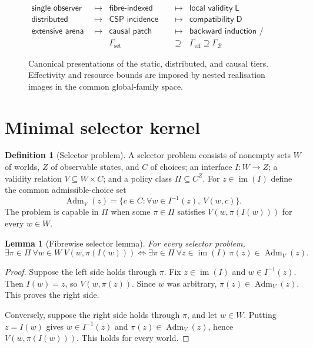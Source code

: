 \documentclass[11pt]{article}
\theoremstyle{plain}
\newtheorem{lemma}[theorem]{Lemma}
\theoremstyle{definition}
\newtheorem{definition}[theorem]{Definition}
\theoremstyle{remark}
\newcommand{\im}{\operatorname{im}}
\newcommand{\Adm}{\operatorname{Adm}}
\begin{document}
\begin{figure}[htbp]
\centering
\[
\begin{array}{rclcl}
\textsf{single observer}
&\longmapsto&
\textsf{fibre-indexed selector}
&\longmapsto&
\textsf{local validity}\;\mathsf L
\\[1mm]
\textsf{distributed observers}
&\longmapsto&
\textsf{CSP incidence diagram}
&\longmapsto&
\textsf{compatibility}\;\mathsf D
\\[1mm]
\textsf{extensive arena}
&\longmapsto&
\textsf{causal patch sheaf}
&\longmapsto&
\textsf{backward induction / matching}
\\[2mm]
&&
\Gamma_{\mathrm{set}}
&\supseteq&
\Gamma_{\mathrm{eff}}\supseteq\Gamma_{\mathcal B}
\end{array}
\]
\caption{Canonical presentations of the static, distributed, and causal tiers.
Effectivity and resource bounds are imposed by nested realisation images in the
common global-family space.}
\label{fig:architecture}
\end{figure}

\section{Minimal selector kernel}\label{sec:kernel}

\begin{definition}[Selector problem]\label{def:selector}
A selector problem consists of nonempty sets $W$ of worlds, $Z$ of observable
states, and $C$ of choices; an interface $I:W\to Z$; a validity relation
$V\subseteq W\times C$; and a policy class $\Pi\subseteq C^Z$. For
$z\in\im(I)$ define the common admissible-choice set
\[
\Adm_V(z)=\{c\in C:\forall w\in I^{-1}(z),\ V(w,c)\}.
\]
The problem is capable in $\Pi$ when some $\pi\in\Pi$ satisfies
$V(w,\pi(I(w)))$ for every $w\in W$.
\end{definition}

\begin{lemma}[Fibrewise selector lemma]\label{lem:selector}
For every selector problem,
\[
\exists\pi\in\Pi\ \forall w\in W\ V(w,\pi(I(w)))
\iff
\exists\pi\in\Pi\ \forall z\in\im(I)\ \pi(z)\in\Adm_V(z).
\]
\end{lemma}

\begin{proof}
Suppose the left side holds through $\pi$. Fix $z\in\im(I)$ and
$w\in I^{-1}(z)$. Then $I(w)=z$, so $V(w,\pi(z))$. Since $w$ was arbitrary,
$\pi(z)\in\Adm_V(z)$. This proves the right side.

Conversely, suppose the right side holds through $\pi$, and let $w\in W$.
Putting $z=I(w)$ gives $w\in I^{-1}(z)$ and
$\pi(z)\in\Adm_V(z)$, hence $V(w,\pi(I(w)))$. This holds for every world.
\end{proof}
\end{document}
